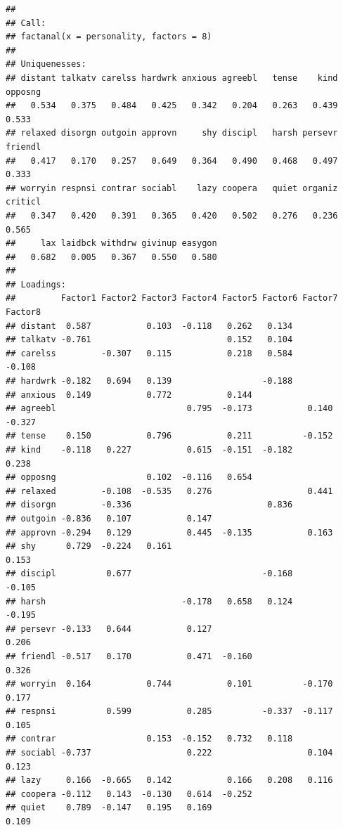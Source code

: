 \documentclass[]{book}
\begin{document}
\begin{verbatim}
## 
## Call:
## factanal(x = personality, factors = 8)
## 
## Uniquenesses:
## distant talkatv carelss hardwrk anxious agreebl   tense    kind opposng 
##   0.534   0.375   0.484   0.425   0.342   0.204   0.263   0.439   0.533 
## relaxed disorgn outgoin approvn     shy discipl   harsh persevr friendl 
##   0.417   0.170   0.257   0.649   0.364   0.490   0.468   0.497   0.333 
## worryin respnsi contrar sociabl    lazy coopera   quiet organiz criticl 
##   0.347   0.420   0.391   0.365   0.420   0.502   0.276   0.236   0.565 
##     lax laidbck withdrw givinup easygon 
##   0.682   0.005   0.367   0.550   0.580 
## 
## Loadings:
##         Factor1 Factor2 Factor3 Factor4 Factor5 Factor6 Factor7 Factor8
## distant  0.587           0.103  -0.118   0.262   0.134                 
## talkatv -0.761                           0.152   0.104                 
## carelss         -0.307   0.115           0.218   0.584          -0.108 
## hardwrk -0.182   0.694   0.139                  -0.188                 
## anxious  0.149           0.772           0.144                         
## agreebl                          0.795  -0.173           0.140  -0.327 
## tense    0.150           0.796           0.211          -0.152         
## kind    -0.118   0.227           0.615  -0.151  -0.182           0.238 
## opposng                  0.102  -0.116   0.654                         
## relaxed         -0.108  -0.535   0.276                   0.441         
## disorgn         -0.336                           0.836                 
## outgoin -0.836   0.107           0.147                                 
## approvn -0.294   0.129           0.445  -0.135           0.163         
## shy      0.729  -0.224   0.161                                   0.153 
## discipl          0.677                          -0.168          -0.105 
## harsh                           -0.178   0.658   0.124          -0.195 
## persevr -0.133   0.644           0.127                           0.206 
## friendl -0.517   0.170           0.471  -0.160                   0.326 
## worryin  0.164           0.744           0.101          -0.170   0.177 
## respnsi          0.599           0.285          -0.337  -0.117   0.105 
## contrar                  0.153  -0.152   0.732   0.118                 
## sociabl -0.737                   0.222                   0.104   0.123 
## lazy     0.166  -0.665   0.142           0.166   0.208   0.116         
## coopera -0.112   0.143  -0.130   0.614  -0.252                         
## quiet    0.789  -0.147   0.195   0.169                           0.109 

\end{verbatim}
\end{document}
